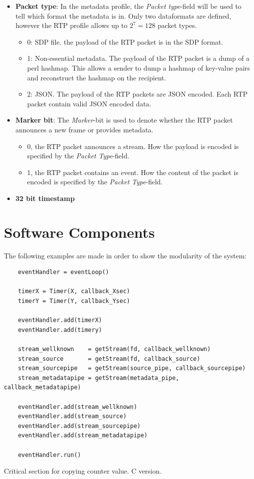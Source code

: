 \begin{itemize}
	\item \textbf{Packet type}: In the metadata profile, the \textit{Packet type}-field will be used to tell which format the metadata is in. Only two  dataformats are defined, however the RTP profile allows up to $2^7=128$  packet types.
		\begin{itemize}
			\item 0: SDP file. the payload of the RTP packet is in the SDP format.
			\item 1: Non-essential metadata. The payload of the RTP packet is a dump of a perl hashmap. This allows a sender to dump a hashmap of key-value pairs and reconstruct the hashmap on the recipient.
			\item 2: JSON. The payload of the RTP packets are JSON encoded. Each RTP packet contain valid JSON encoded data.
		\end{itemize}
	\item \textbf{Marker bit}: The \textit{Marker}-bit is used to denote whether the RTP packet announces a new frame or provides metadata.
		\begin{itemize}
			\item 0, the RTP packet announces a stream. How the payload is encoded is specified by the \textit{Packet Type}-field.
			\item 1, the RTP packet contains an event. How the content of the packet is encoded is specified by the \textit{Packet Type}-field.
		\end{itemize}
	\item \textbf{32 bit timestamp}
\end{itemize}




\section{Software Components}
The following examples are made in order to show the modularity of the system:



\begin{listing}[h] 
\begin{verbatim}
	eventHandler = eventLoop()
	
	timerX = Timer(X, callback_Xsec)
	timerY = Timer(Y, callback_Ysec)
	
	eventHandler.add(timerX)
	eventHandler.add(timery)
	
	stream_wellknown    = getStream(fd, callback_wellknown)
	stream_source       = getStream(fd, callback_source)
	stream_sourcepipe   = getStream(source_pipe, callback_sourcepipe)
	stream_metadatapipe = getStream(metadata_pipe, callback_metadatapipe)	
	
	eventHandler.add(stream_wellknown)
	eventHandler.add(stream_source)
	eventHandler.add(stream_sourcepipe)
	eventHandler.add(stream_metadatapipe)
	
	eventHandler.run()
\end{verbatim}
\caption{Critical section for copying counter value. C version.}
\label{code:critical_section_c}
\end{listing}



